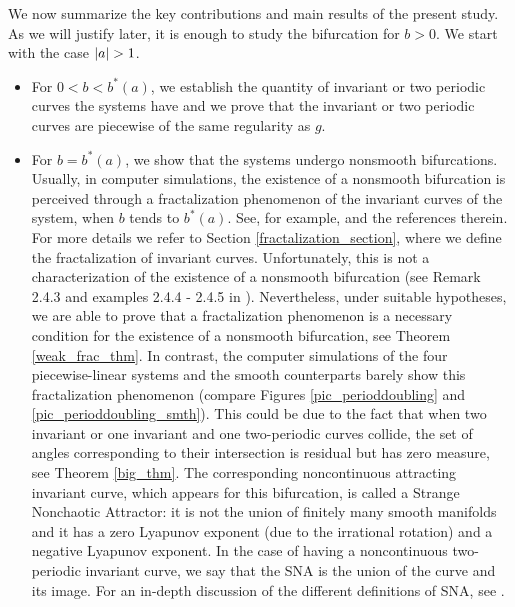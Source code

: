 \documentclass[12pt]{article}
\theoremstyle{plain}
\theoremstyle{remark}
\DeclarePairedDelimiter\abs{\lvert}{\rvert}
\theoremstyle{definition}
\begin{document}
We now summarize the key contributions and main results of the present study. As we will justify later, it is enough to study the bifurcation for $b>0$. We start with the case $\abs{a}>1$.
\begin{itemize}
    \item For $0<b<b^*(a)$, we establish the quantity of invariant or two periodic curves the systems have and we prove that the invariant or two periodic curves are piecewise of the same regularity as $g$. 
    \item For $b=b^*(a)$, we show that the systems undergo nonsmooth bifurcations. Usually, in computer simulations, the existence of a nonsmooth bifurcation is perceived through a fractalization phenomenon of the invariant curves of the system, when $b$ tends to $b^*(a)$. See, for example, \cite{Jorba2007Old} and the references therein. For more details we refer to Section \ref{fractalization_section}, where we define the fractalization of invariant curves. Unfortunately, this is not a characterization of the existence of a nonsmooth bifurcation (see Remark 2.4.3 and examples 2.4.4 - 2.4.5 in \cite{cobzacs2019lipschitz}). Nevertheless, under  suitable hypotheses, we are able to prove that a fractalization phenomenon is a necessary condition for the existence of a nonsmooth bifurcation, see Theorem \ref{weak_frac_thm}. In contrast, the computer simulations of the four piecewise-linear systems and the smooth counterparts barely show this fractalization phenomenon (compare Figures \ref{pic_perioddoubling} and \ref{pic_perioddoubling_smth}). This could be due to the fact that when two invariant or one invariant and one two-periodic curves collide, the set of angles corresponding to their intersection is residual but has zero measure, see Theorem \ref{big_thm}. The corresponding noncontinuous attracting invariant curve, which appears for this bifurcation, is called a Strange Nonchaotic Attractor: it is not the union of finitely many smooth manifolds and it has a zero Lyapunov exponent (due to the irrational rotation) and a negative Lyapunov exponent. In the case of having a noncontinuous two-periodic invariant curve, we say that the SNA is the union of the curve and its image. For an in-depth discussion of the different definitions of SNA, see \cite{Als2009Ondef}. 
    

\end{itemize}
\end{document}
